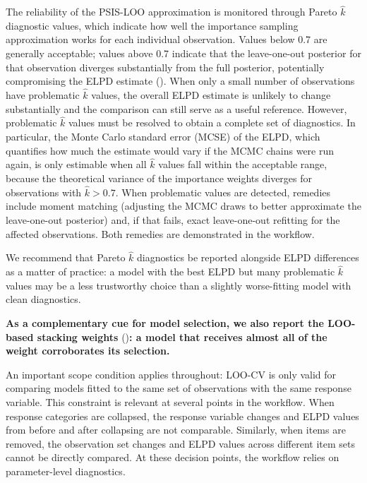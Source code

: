 \documentclass[
  man,
  floatsintext,
  longtable,
  nolmodern,
  notxfonts,
  notimes,
  colorlinks=true,linkcolor=blue,citecolor=blue,urlcolor=blue]{apa7}
\newcommand{\rev}[1]{\textbf{\textcolor{revcol}{#1}}}  %
\begin{document}
The reliability of the PSIS-LOO approximation is monitored through
Pareto \(\hat{k}\) diagnostic values, which indicate how well the
importance sampling approximation works for each individual observation.
Values below 0.7 are generally acceptable; values above 0.7 indicate
that the leave-one-out posterior for that observation diverges
substantially from the full posterior, potentially compromising the ELPD
estimate (). When
only a small number of observations have problematic \(\hat{k}\) values,
the overall ELPD estimate is unlikely to change substantially and the
comparison can still serve as a useful reference. However, problematic
\(\hat{k}\) values must be resolved to obtain a complete set of
diagnostics. In particular, the Monte Carlo standard error (MCSE) of the
ELPD, which quantifies how much the estimate would vary if the MCMC
chains were run again, is only estimable when all \(\hat{k}\) values
fall within the acceptable range, because the theoretical variance of
the importance weights diverges for observations with \(\hat{k} > 0.7\).
When problematic values are detected, remedies include moment matching
(adjusting the MCMC draws to better approximate the leave-one-out
posterior) and, if that fails, exact leave-one-out refitting for the
affected observations. Both remedies are demonstrated in the workflow.

We recommend that Pareto \(\hat{k}\) diagnostics be reported alongside
ELPD differences as a matter of practice: a model with the best ELPD but
many problematic \(\hat{k}\) values may be a less trustworthy choice
than a slightly worse-fitting model with clean diagnostics.

\rev{As a complementary cue for model selection, we also report the LOO-based stacking weights}
()\rev{: a model that receives almost all of the weight corroborates its selection.}

An important scope condition applies throughout: LOO-CV is only valid
for comparing models fitted to the same set of observations with the
same response variable. This constraint is relevant at several points in
the workflow. When response categories are collapsed, the response
variable changes and ELPD values from before and after collapsing are
not comparable. Similarly, when items are removed, the observation set
changes and ELPD values across different item sets cannot be directly
compared. At these decision points, the workflow relies on
parameter-level diagnostics.
\end{document}
